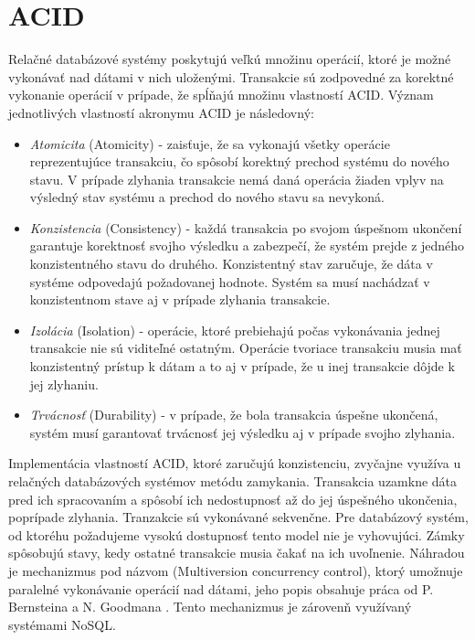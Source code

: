 \documentclass[11pt,twoside,a4paper]{book}
\begin{document}


\section{ACID}

Relačné databázové systémy poskytujú veľkú množinu operácií, ktoré je možné vykonávať nad dátami v nich uloženými. Transakcie \cite{gray1981transaction}\cite{haerder1983principles} sú zodpovedné za korektné vykonanie operácií v prípade, že spĺňajú množinu vlastností ACID. Význam jednotlivých vlastností akronymu ACID je následovný:

\begin{itemize}
  \item \emph{Atomicita} (Atomicity) - zaisťuje, že sa vykonajú všetky operácie reprezentujúce transakciu, čo spôsobí korektný prechod systému do nového stavu. V prípade zlyhania transakcie nemá daná operácia žiaden vplyv na výsledný stav systému a prechod do nového stavu sa nevykoná.
  \item \emph{Konzistencia} (Consistency) - každá transakcia po svojom úspešnom ukončení garantuje korektnosť svojho výsledku a zabezpečí, že systém prejde z jedného konzistentného stavu do druhého. Konzistentný stav zaručuje, že dáta v systéme odpovedajú požadovanej hodnote. Systém sa musí nachádzať v konzistentnom stave aj v prípade zlyhania transakcie.
  \item \emph{Izolácia} (Isolation) - operácie, ktoré prebiehajú počas vykonávania jednej transakcie nie sú viditeľné ostatným. Operácie tvoriace transakciu musia mať konzistentný prístup k dátam a to aj v prípade, že u inej transakcie dôjde k jej zlyhaniu.
  \item \emph{Trvácnosť} (Durability) - v prípade, že bola transakcia úspešne ukončená, systém musí garantovať trvácnosť jej výsledku aj v prípade svojho zlyhania.
\end{itemize}
Implementácia vlastností ACID, ktoré zaručujú konzistenciu, zvyčajne využíva u relačných databázových systémov metódu zamykania. Transakcia uzamkne dáta pred ich spracovaním a spôsobí ich nedostupnosť až do jej úspešného ukončenia, poprípade zlyhania. Tranzakcie sú vykonávané sekvenčne. Pre databázový systém, od ktoréhu požadujeme vysokú dostupnosť tento model nie je vyhovujúci. Zámky spôsobujú stavy, kedy ostatné transakcie musia čakať na ich uvoľnenie. Náhradou je mechanizmus pod názvom  (Multiversion concurrency control), ktorý umožnuje paralelné vykonávanie operácií nad dátami, jeho popis obsahuje práca od P. Bernsteina a N. Goodmana \cite{bernstein1981concurrency}. Tento mechanizmus je zárovenň využívaný systémami NoSQL.
\end{document}
